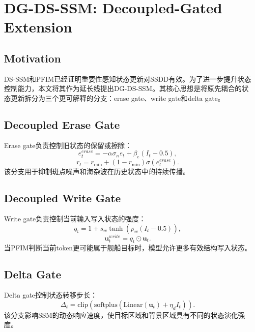 \documentclass[UTF8,zihao=-4]{ctexart}
\begin{document}
\section{DG-DS-SSM: Decoupled-Gated Extension}

\subsection{Motivation}

DS-SSM和PFIM已经证明重要性感知状态更新对SSDD有效。为了进一步提升状态控制能力，本文将其作为延长线提出DG-DS-SSM。其核心思想是将原先耦合的状态更新拆分为三个更可解释的分支：erase gate、write gate和delta gate。

\subsection{Decoupled Erase Gate}

Erase gate负责控制旧状态的保留或擦除：
\begin{equation}
  e^{erase}_t = -\alpha\sigma_n e_t + \beta_e(I_t-0.5),
\end{equation}
\begin{equation}
  r_t = r_{\min} + (1-r_{\min})\sigma(e^{erase}_t).
\end{equation}
该分支用于抑制斑点噪声和海杂波在历史状态中的持续传播。

\subsection{Decoupled Write Gate}

Write gate负责控制当前输入写入状态的强度：
\begin{equation}
  q_t = 1 + s_w \tanh(\rho_w(I_t-0.5)),
\end{equation}
\begin{equation}
  \mathbf{u}^{write}_t = q_t \odot \mathbf{u}_t.
\end{equation}
当PFIM判断当前token更可能属于舰船目标时，模型允许更多有效结构写入状态。

\subsection{Delta Gate}

Delta gate控制状态转移步长：
\begin{equation}
  \Delta_t = \mathrm{clip}\left(
  \mathrm{softplus}(\mathrm{Linear}(\mathbf{u}_t)+\eta_d I_t)
  \right).
\end{equation}
该分支影响SSM的动态响应速度，使目标区域和背景区域具有不同的状态演化强度。
\end{document}
